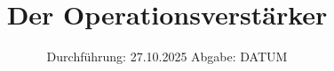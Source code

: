

\subject{V51}
\title{Der Operationsverstärker}
\date{%
  Durchführung: 27.10.2025
  \hspace{3em}
  Abgabe: DATUM
}



\maketitle
\thispagestyle{empty}
\tableofcontents
\newpage







\printbibliography{}


